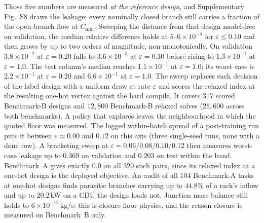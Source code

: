 \documentclass[journal]{IEEEtran}
\begin{document}
Those five numbers are measured \emph{at the reference design}, and
Supplementary Fig.~S8 draws the leakage: every nominally closed branch still carries
a fraction of the open-branch flow at $C_{\min}$.  Sweeping the distance from that
design model-free on validation, the median relative difference holds at
$5$--$6\times10^{-4}$ for $\varepsilon\le0.10$ and then grows by up to two orders of
magnitude, non-monotonically.  On validation $3.8\times10^{-2}$ at $\varepsilon=0.20$
falls to $3.6\times10^{-3}$ at $\varepsilon=0.30$ before rising to $1.3\times10^{-1}$
at $\varepsilon=1.0$.  The test column's median reaches $1.1\times10^{-1}$ at $\varepsilon=1.0$; its worst
case is $2.2\times10^{-1}$ at $\varepsilon=0.20$ and $6.6\times10^{-1}$ at
$\varepsilon=1.0$.  The sweep replaces each decision of the label design with a uniform draw at rate
$\varepsilon$ and scores the relaxed index at the resulting one-hot vertex against
the hard compile.  It covers $317$ scored Benchmark-B designs and $12{,}800$ Benchmark-B
relaxed solves ($25{,}600$ across both benchmarks).
A policy that explores leaves the neighbourhood in which the quoted floor was
measured.  The logged within-batch spread of a post-training run puts it between
$\varepsilon\approx0.00$ and $0.12$ on this axis (three single-seed runs, none with a
done row).  A bracketing sweep at $\varepsilon=0.06/0.08/0.10/0.12$ then measures worst-case leakage
up to $0.369$ on validation and $0.203$ on test within the band.
Benchmark~A gives exactly $0.0$ on all $320$ such pairs, since its relaxed
index at a one-hot design is the deployed objective.  An audit of all $104$ Benchmark-A tasks at one-hot designs finds parasitic
branches carrying up to $44.8\%$ of a rack's inflow and up to $20.2$\,kW on a CDU
the design loads not.  Junction mass balance still holds to
$6\times10^{-12}$\,kg/s: this is closure-floor physics, and the reason closure is
measured on Benchmark~B only.
\end{document}
